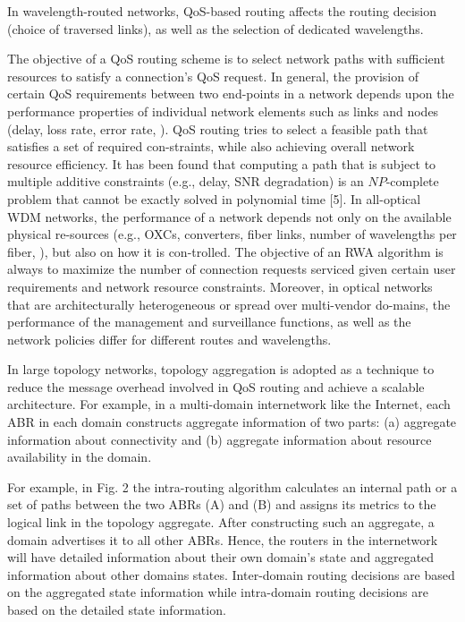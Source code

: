 In wavelength-routed networks, QoS-based routing affects the routing decision (\ie choice of traversed links), as well as the selection of dedicated wavelengths.

The objective of a QoS routing scheme is to select network paths with sufficient resources to satisfy a connection's QoS request. In general, the provision of certain QoS requirements between two end-points in a network depends upon the performance properties of individual network elements such as links and nodes (\eg delay, loss rate, error rate, \etc). QoS routing tries to select a feasible path that satisfies a set of required con-straints, while also achieving overall network resource efficiency. It has been found that computing a path that is subject to multiple additive constraints (e.g., delay, SNR degradation) is an $NP$-complete problem that cannot be exactly solved in polynomial time [5].
In all-optical WDM networks, the performance of a network depends not only on the available physical re-sources (e.g., OXCs, converters, fiber links, number of wavelengths per fiber, \etc), but also on how it is con-trolled. The objective of an RWA algorithm is always to maximize the number of connection requests serviced given certain user requirements and network resource constraints. Moreover, in optical networks that are architecturally heterogeneous or spread over multi-vendor do-mains, the performance of the management and surveillance functions, as well as the network policies differ for different routes and wavelengths.

In large topology networks, topology aggregation is adopted as a technique to reduce the message overhead involved in QoS routing and achieve a scalable architecture. For example, in a multi-domain internetwork like the Internet, each ABR in each domain constructs aggregate information of two parts: (a) aggregate information about connectivity and (b) aggregate information about resource availability in the domain.

For example, in Fig. 2 the intra-routing algorithm calculates an internal path or a set of paths between the two \gls{ABR}s (A) and (B) and assigns its metrics to the logical link in the topology aggregate. After constructing such an aggregate, a domain advertises it to all other ABRs.
Hence, the routers in the internetwork will have detailed information about their own domain's state and aggregated information about other domains states. Inter-domain routing decisions are based on the aggregated state information while intra-domain routing decisions are based on the detailed state information. 

